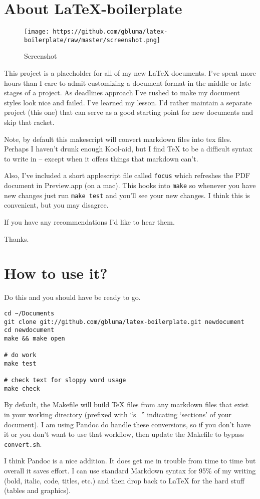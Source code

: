 \section{About LaTeX-boilerplate}

\begin{figure}[htbp]
\centering
\texttt{[image: https://github.com/gbluma/latex-boilerplate/raw/master/screenshot.png]}
\caption{Screenshot}
\end{figure}

This project is a placeholder for all of my new LaTeX documents. I've
spent more hours than I care to admit customizing a document format in
the middle or late stages of a project. As deadlines approach I've
rushed to make my document styles look nice and failed. I've learned my
lesson. I'd rather maintain a separate project (this one) that can serve
as a good starting point for new documents and skip that racket.

Note, by default this makescript will convert markdown files into tex
files. Perhaps I haven't drunk enough Kool-aid, but I find TeX to be a
difficult syntax to write in -- except when it offers things that
markdown can't.

Also, I've included a short applescript file called \texttt{focus} which
refreshes the PDF document in Preview.app (on a mac). This hooks into
\texttt{make} so whenever you have new changes just run
\texttt{make test} and you'll see your new changes. I think this is
convenient, but you may disagree.

If you have any recommendations I'd like to hear them.

Thanks.

\section{How to use it?}

Do this and you should have be ready to go.

\begin{verbatim}
cd ~/Documents
git clone git://github.com/gbluma/latex-boilerplate.git newdocument
cd newdocument
make && make open

# do work
make test

# check text for sloppy word usage
make check
\end{verbatim}

By default, the Makefile will build TeX files from any markdown files
that exist in your working directory (prefixed with ``s\_'' indicating
`sections' of your document). I am using Pandoc do handle these
conversions, so if you don't have it or you don't want to use that
workflow, then update the Makefile to bypass \texttt{convert.sh}.

I think Pandoc is a nice addition. It does get me in trouble from time
to time but overall it saves effort. I can use standard Markdown syntax
for 95\% of my writing (bold, italic, code, titles, etc.) and then drop
back to LaTeX for the hard stuff (tables and graphics).
